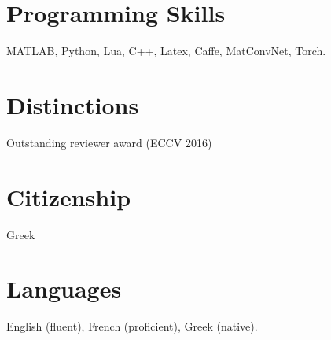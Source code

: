 \documentclass[margin]{res}
\begin{document}
\begin{resume}
\section{Programming Skills} MATLAB, Python, Lua, C++, Latex, Caffe, MatConvNet, Torch. 
\newline

\section{Distinctions} Outstanding reviewer award (ECCV 2016)
\section{Citizenship} Greek
\section{Languages} English (fluent), French (proficient), Greek (native).
 
\end{resume}
\end{document}
